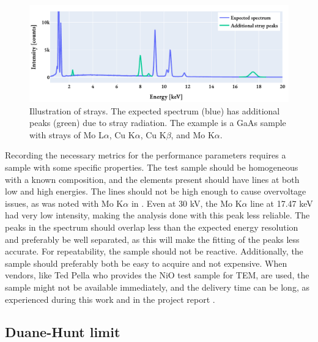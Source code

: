 \begin{figure}[htp]
    \centering
    \includegraphics[width=0.8\linewidth]{figures/pp_strays.pdf}
    \caption{
        Illustration of strays.
        The expected spectrum (blue) has additional peaks (green) due to stray radiation.
        The example is a GaAs sample with strays of Mo L$\alpha$, Cu K$\alpha$, Cu K$\beta$, and Mo K$\alpha$.
    }
    \label{fig:theory:eds_performance:overview:strays}
\end{figure}




Recording the necessary metrics for the performance parameters requires a sample with some specific properties.
The test sample should be homogeneous with a known composition, and the elements present should have lines at both low and high energies.
The lines should not be high enough to cause overvoltage issues, as was noted with Mo K$\alpha$ in \cite{project_report}.
Even at 30 kV, the Mo K$\alpha$ line at 17.47 keV had very low intensity, making the analysis done with this peak less reliable.
The peaks in the spectrum should overlap less than the expected energy resolution and preferably be well separated, as this will make the fitting of the peaks less accurate.
For repeatability, the sample should not be reactive.
Additionally, the sample should preferably both be easy to acquire and not expensive.
When vendors, like Ted Pella who provides the NiO test sample for TEM, are used, the sample might not be available immediately, and the delivery time can be long, as experienced during this work and in the project report \cite{project_report}.







\subsection{Duane-Hunt limit}
\label{theory:eds_performance:duanehunt}

